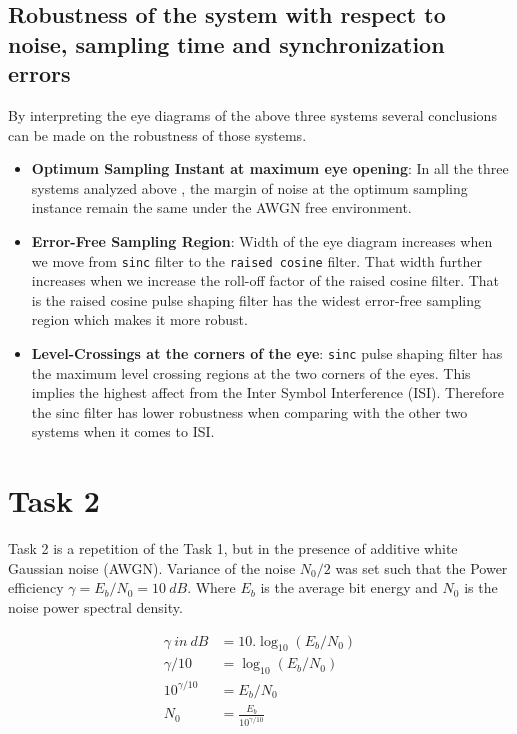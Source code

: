 \documentclass[a4paper,11pt]{article}%
\begin{document}
\subsection{Robustness of the system with respect to noise, sampling time and synchronization errors}

By interpreting the eye diagrams of the above three systems several conclusions can be made on the robustness of those systems.

\begin{itemize}
	\item \textbf{Optimum Sampling Instant at maximum eye opening}: In all the three systems analyzed above , the margin of noise at the optimum sampling instance remain the same under the AWGN free environment.
	\item \textbf{Error-Free Sampling Region}: Width of the eye diagram increases when we move from { \tt sinc} filter to the {\tt raised cosine} filter. That width further increases when we increase the roll-off factor of the raised cosine filter. That is the raised cosine pulse shaping filter has the widest error-free sampling region which makes it more robust.
	\item \textbf{Level-Crossings at the corners of the eye}: {\tt sinc} pulse shaping filter has the maximum level crossing regions at the two corners of the eyes. This implies the highest affect from the Inter Symbol Interference (ISI). Therefore the sinc filter has lower robustness when comparing with the other two systems when it comes to ISI. 
	
\end{itemize}



\section{Task 2}
Task 2 is a repetition of the Task 1, but in the presence of additive white Gaussian noise (AWGN). Variance of the noise $N_0/2$ was set such that the Power efficiency $\gamma = E_b/N_0 = 10 ~dB$. Where $E_b$ is the average bit energy and $N_0$ is the noise power spectral density.

\[
\begin{split}
	\gamma~in~dB &= 10.\log_{10}(E_b/N_0)\\
	\gamma/10 &= \log_{10}(E_b/N_0)\\
	10^{\gamma/10} &= E_b/N_0\\
	N_0 &= \frac{E_b}{10^{\gamma/10}}
\end{split}
\]
\end{document}
